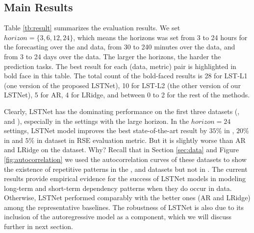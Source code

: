 \subsection{Main Results}
\label{sec:result}


Table \ref{tb:result} summarizes the evaluation results. We set $horizon = \{3,6,12,24\}$, which means the horizons was set from 3 to 24 hours for the forecasting over the \electricity and \traffic data, from 30 to 240 minutes over the \solar data, and from 3 to 24 days over the \exchange data. The larger the horizons, the harder the prediction tasks. The best result for each (data, metric) pair is highlighted in bold face in this table.  The total count of the bold-faced results is 28 for LST-L1 (one version of the proposed LSTNet), 10 for LST-L2 (the other version of our LSTNet), 5 for AR, 4 for LRidge, and between 0 to 2 for the rest of the methods.  

Clearly, LSTNet has the dominating performance on the first three datasets (\electricity, \solar and \traffic), especially in the settings with the large horizon. In the $horizon=24$ settings, LSTNet model improves the best state-of-the-art result by $35\%$ in \solar, $20\%$ in \traffic and $5\%$ in \electricity dataset in RSE evaluation metric. But it is slightly worse than AR and LRidge on the \exchange dataset. Why?  Recall that in Section \ref{sec:data} and Figure  \ref{fig:autocorrelation} we used the autocorrelation curves of these datasets to show the existence of  repetitive patterns in the \solar, \traffic and \electricity datasets but not in \exchange.  The current results provide empirical evidence for the success of LSTNet models in modeling long-term and short-term dependency patterns when they do occur in data.  Otherwise, LSTNet performed comparably  with the better ones (AR and LRidge) among the representative baselines.  The robustness of LSTNet is also due to its inclusion of the autoregressive model as a component, which we will discuss further in next section.


